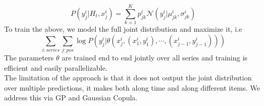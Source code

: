 \begin{equation}
	P(y_j^i|H_t, x_j^i) = {\sum_{k=1}^K p_{jk}^i \mathcal{N}(y_j^i|\mu_{jk}^i, \sigma_{jk}^i)}
\end{equation}
To train the above, we model the full joint distribution and maximize it, i.e
\begin{equation}
	\sum_{i:series}\sum_{j:pos} \log P(y_j^i | \theta(x_j^i, (x_1^i, y_1^i), \cdots, (x_{j-1}^i, y_{j-1}^i)))
\end{equation}
The parameters $\theta$ are trained end to end jointly over all series and training is efficient and easily parallelizable. \\
The limitation of the approach is that it does not output the joint distribution over multiple predictions, it makes both along time and along different items. We address this via GP and Gaussian Copula.
